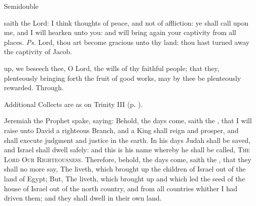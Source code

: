 \begin{inhead}
{Semidouble}
\end{inhead}
\par\noindent
{}


\introit
{} saith the Lord: I think thoughts of peace, and not of affliction: ye shall call upon me, and I will hearken unto you: and will bring again your captivity from all places. \textit{Ps.} Lord, thou art become gracious unto thy land: thou hast turned away the captivity of Jacob.

\collect
{} up, we beseech thee, O Lord, the wills of thy faithful people; that they, plenteously bringing forth the fruit of good works, may by thee be plenteously rewarded. Through.
\begin{rubric}
    Additional Collects are as on Trinity III (p. \pageref{TrinityIII}).
\end{rubric}

 Jeremiah the Prophet spake, saying: Behold, the days come, saith the , that I will raise unto David a righteous Branch, and a King shall reign and prosper, and shall execute judgment and justice in the earth. In his days Judah shall be saved, and Israel shall dwell safely: and this is his name whereby he shall be called, \textsc{The Lord Our Righteousness}. Therefore, behold, the days come, saith the , that they shall no more say, The  liveth, which brought up the children of Israel out of the land of Egypt; But, The  liveth, which brought up and which led the seed of the house of Israel out of the north country, and from all countries whither I had driven them; and they shall dwell in their own land.


